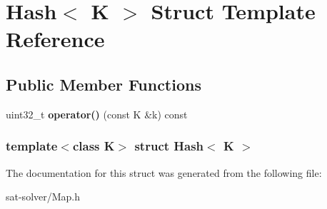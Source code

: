 \hypertarget{structHash}{\section{\-Hash$<$ \-K $>$ \-Struct \-Template \-Reference}
\label{structHash}
}
\subsection*{\-Public \-Member \-Functions}
\begin{DoxyCompactItemize}
\item 
\hypertarget{structHash_a4a1c142a06baadd553bb81951fe7fa2e}{uint32\-\_\-t {\bfseries operator()} (const \-K \&k) const }\label{structHash_a4a1c142a06baadd553bb81951fe7fa2e}

\end{DoxyCompactItemize}
\subsubsection*{template$<$class K$>$ struct Hash$<$ K $>$}



\-The documentation for this struct was generated from the following file\-:\begin{DoxyCompactItemize}
\item 
sat-\/solver/\-Map.\-h\end{DoxyCompactItemize}
